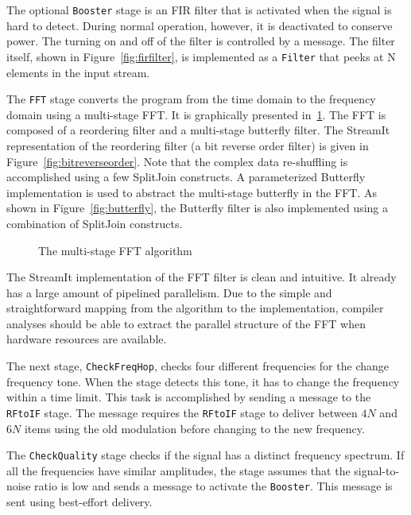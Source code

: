 The optional {\tt Booster} stage is an FIR filter that is activated
when the signal is hard to detect. During normal operation, however,
it is deactivated to conserve power. The turning on and off of the
filter is controlled by a message.  The filter itself, shown in
Figure~\ref{fig:firfilter}, is implemented as a {\tt Filter} that
peeks at N elements in the input stream.

The {\tt FFT} stage converts the program from the time domain to the
frequency domain using a multi-stage FFT. It is graphically presented
in~\ref{fig:fftfilter}. The FFT is composed of a reordering filter and
a multi-stage butterfly filter. The StreamIt representation of the
reordering filter (a bit reverse order filter) is given in
Figure~\ref{fig:bitreverseorder}. Note that the complex data
re-shuffling is accomplished using a few SplitJoin constructs.  A
parameterized Butterfly implementation is used to abstract the
multi-stage butterfly in the FFT. As shown in
Figure~\ref{fig:butterfly}, the Butterfly filter is also implemented
using a combination of SplitJoin constructs.

\begin{figure}[t]
\centering
{}
\vspace{-0.1in}
\caption{The multi-stage FFT algorithm}
\vspace{-12pt}
\label{fig:fftfilter}
\end{figure}

The StreamIt implementation of the FFT filter is clean and
intuitive. It already has a large amount of pipelined parallelism. Due
to the simple and straightforward mapping from the algorithm to the
implementation, compiler analyses should be able to extract the
parallel structure of the FFT when hardware resources are available.

The next stage, {\tt CheckFreqHop}, checks four different frequencies
for the change frequency tone. When the stage detects this tone, it
has to change the frequency within a time limit. This task is
accomplished by sending a message to the {\tt RFtoIF} stage.  The
message requires the {\tt RFtoIF} stage to deliver between $4N$ and
$6N$ items using the old modulation before changing to the new
frequency.

The {\tt CheckQuality} stage checks if the signal has a distinct
frequency spectrum. If all the frequencies have similar amplitudes,
the stage assumes that the signal-to-noise ratio is low and sends a
message to activate the {\tt Booster}. This message is sent using
best-effort delivery.

